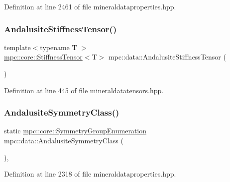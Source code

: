Definition at line 2461 of file mineraldataproperties.\+hpp.

\mbox{\label{namespacempc_1_1data_a4f5f753af2a32f37e2e4b015c90b67c8}} 
\subsubsection{\texorpdfstring{Andalusite\+Stiffness\+Tensor()}{AndalusiteStiffnessTensor()}}
{\footnotesize\ttfamily template$<$typename T $>$ \\
\mbox{\hyperlink{structmpc_1_1core_1_1_stiffness_tensor}{mpc\+::core\+::\+Stiffness\+Tensor}}$<$T$>$ mpc\+::data\+::\+Andalusite\+Stiffness\+Tensor (\begin{DoxyParamCaption}{ }\end{DoxyParamCaption})}



Definition at line 445 of file mineraldatatensors.\+hpp.

\mbox{\label{namespacempc_1_1data_a4e19ba7dc81d8b195da2a22f204f76ce}} 
\subsubsection{\texorpdfstring{Andalusite\+Symmetry\+Class()}{AndalusiteSymmetryClass()}}
{\footnotesize\ttfamily static \mbox{\hyperlink{namespacempc_1_1core_a9d979684062547055a0ef5c13077bad8}{mpc\+::core\+::\+Symmetry\+Group\+Enumeration}} mpc\+::data\+::\+Andalusite\+Symmetry\+Class (\begin{DoxyParamCaption}{ }\end{DoxyParamCaption})\hspace{0.3cm}{\ttfamily [inline]}, {\ttfamily [static]}}



Definition at line 2318 of file mineraldataproperties.\+hpp.

\mbox{\label{namespacempc_1_1data_aa6c97d6399acedca0c1928578980db78}} 
